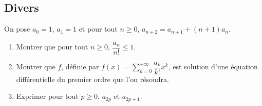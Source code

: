 \documentclass[a4paper,twoside,french,11pt]{VcCours}
\begin{document}
\subsection{Divers}



\begin{Exercice}{} On pose $a_0=1$, $a_1=1$ et pour tout $n \geq 0$, $a_{n+2} = a_{n+1} + (n+1)a_n$.
\begin{enumerate}
\item Montrer que pour tout $n \geq 0$, $\dfrac{a_n}{n!} \leq 1$.
\item Montrer que $f$, définie par $f(x) = \sum_{k=0}^{+ \infty} \dfrac{a_k}{k!}x^k$, est solution d'une équation différentielle du premier ordre que l'on résoudra.
\item Exprimer pour tout $p \geq 0$, $a_{2p}$ et $a_{2p+1}$.
\end{enumerate}
\end{Exercice}
\end{document}
